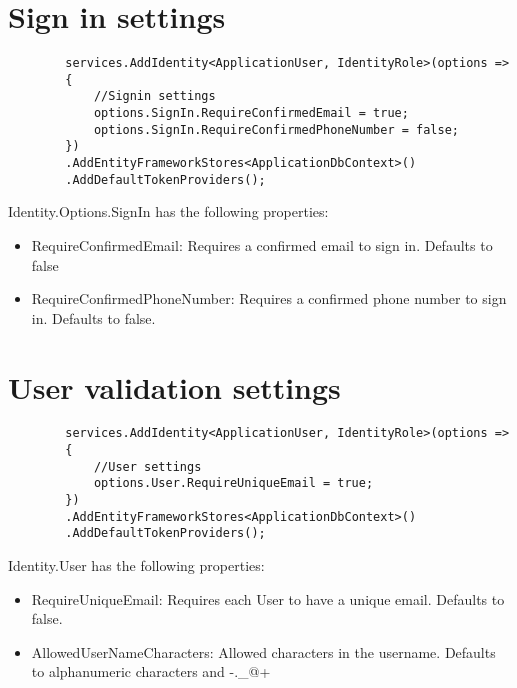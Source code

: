 \documentclass{report}
\begin{document}
    \section{Sign in settings}
    \lstset{style=sharpc}
    \begin{lstlisting}
        services.AddIdentity<ApplicationUser, IdentityRole>(options =>
        {
            //Signin settings
            options.SignIn.RequireConfirmedEmail = true;
            options.SignIn.RequireConfirmedPhoneNumber = false;
        })
        .AddEntityFrameworkStores<ApplicationDbContext>()
        .AddDefaultTokenProviders();
    \end{lstlisting}

    Identity.Options.SignIn has the following properties:
    \begin{itemize}
        \item RequireConfirmedEmail: Requires a confirmed email to sign
        in. Defaults to false
        \item RequireConfirmedPhoneNumber: Requires a confirmed phone number
        to sign in. Defaults to false.
    \end{itemize}

    \section{User validation settings}
    \lstset{style=sharpc}
    \begin{lstlisting}
        services.AddIdentity<ApplicationUser, IdentityRole>(options =>
        {
            //User settings
            options.User.RequireUniqueEmail = true;
        })
        .AddEntityFrameworkStores<ApplicationDbContext>()
        .AddDefaultTokenProviders();
    \end{lstlisting}

    Identity.User has the following properties:
    \begin{itemize}
        \item RequireUniqueEmail: Requires each User to have a unique email.
        Defaults to false.
        \item AllowedUserNameCharacters: Allowed characters in the username.
        Defaults to alphanumeric characters and -._@+
    \end{itemize}
\end{document}

